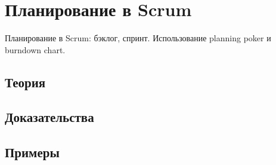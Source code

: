 
\section{Планирование в Scrum}
\label{sec:2.6.08-scrum-planning}

\begin{ticket}
Планирование в Scrum: бэклог, спринт. Использование planning poker и burndown chart.
\end{ticket}

\subsection*{Теория}

\subsection*{Доказательства}

\subsection*{Примеры}
